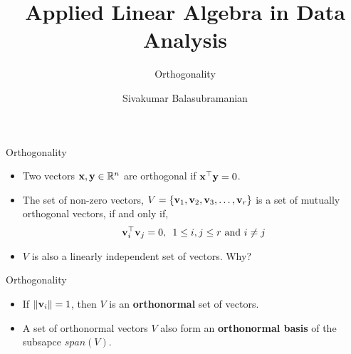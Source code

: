 \documentclass[aspectratio=169]{beamer}
\title{Applied Linear Algebra in Data Analysis}
\subtitle{Orthogonality}
\author{Sivakumar Balasubramanian}
\institute[Christian Medical College] %
{
  \inst{}%
  Department of Bioengineering\\
  Christian Medical College, Bagayam\\
  Vellore 632002
}
\date{}
\let\olditem\item
\renewcommand{\item}{\setlength{\itemsep}{\fill}\olditem}
\def\mf{\ensuremath\mathbf}
\def\mb{\ensuremath\mathbb}
\def\lV{\ensuremath\left\lVert}
\def\rV{\ensuremath\right\rVert}
\begin{document}
\begin{frame}
  \titlepage
\end{frame}



\begin{frame}[t]{Orthogonality}
\begin{itemize}
\item Two vectors $\mf{x}, \mf{y} \in \mb{R}^n$ are orthogonal if $\mf{x}^\top\mf{y} = 0$.
\begin{center}
\end{center}

\item The set of non-zero vectors, $V = \left\{\mf{v}_1, \mf{v}_2, \mf{v}_3, \ldots, \mf{v}_r\right\}$ is a set of mutually orthogonal vectors, if and only if,
$$\mf{v}_i^\top\mf{v}_j = 0, \,\,\, 1 \leq i, j \leq r \text{ and } i \neq j$$

\item $V$ is also a linearly independent set of vectors. Why?

\end{itemize}
\end{frame}


\begin{frame}[t]{Orthogonality}
\begin{itemize}

\item If $\lV \mf{v}_i \rV = 1$, then $V$ is an \textbf{orthonormal} set of vectors.

\item A set of orthonormal vectors $V$ also form an \textbf{orthonormal basis} of the subsapce $span \left(V\right)$.

\end{itemize}
\end{frame}
\end{document}

